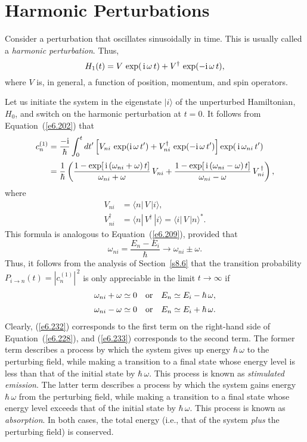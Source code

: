 \section{Harmonic Perturbations}
Consider a  perturbation that  oscillates sinusoidally in time.
This is usually called a {\em harmonic perturbation}. Thus,
\begin{equation}\label{e6.227}
H_1(t) = V\,\exp(\,{\rm i}\,\omega \,t) + V^\dagger \,\exp(-{\rm i}\,\omega\, t),
\end{equation}
where $V$ is, in general, a function of  position, momentum, and
spin operators. 

Let us initiate the system in the eigenstate $|i\rangle$ of the unperturbed
Hamiltonian, $H_0$, and switch on the harmonic perturbation at $t=0$. 
It follows from Equation~(\ref{e6.202}) that
\begin{align}\label{e6.228}
c_n^{(1)} &= \frac{-{\rm i}}{\hbar} \int_0^t dt'\left[V_{ni} \,\exp({\rm i}\,\omega
\,t') + V_{ni}^\dagger\, \exp(-{\rm i}\,\omega\, t')\right]\exp(\,{\rm i}\,
\omega_{ni}\, t')\nonumber\\[0.5ex]
&= \frac{1}{\hbar} \left(\frac{1-\exp[\,{\rm i}\,(\omega_{ni} + \omega)\,t]}
{\omega_{ni} + \omega}\, V_{ni}+\frac{1-\exp[\,{\rm i}\,(\omega_{ni}-\omega
)\,t]}
{\omega_{ni} - \omega} \,V_{ni}^{\,\dagger}\right),
\end{align}
where
\begin{align}\label{e6.229}
V_{ni} &= \langle n|\,V\,| i\rangle,\\[0.5ex]
V_{ni}^\dagger &= \langle n |\,V^\dagger\, |i\rangle = \langle i|\,V\,|n\rangle^\ast.\label{e6.230}
\end{align}
This formula is analogous to Equation~(\ref{e6.209}), provided that
\begin{equation}
\omega_{ni} = \frac{E_n-E_i}{\hbar} \rightarrow \omega_{ni}\pm \omega.
\end{equation}
Thus, it follows from  the  analysis of Section~\ref{s8.6} that
 the transition probability
$P_{i\rightarrow n}(t)=|c_n^{(1)}|^{\,2}$ is only appreciable in the limit $t\rightarrow\infty$ if
\begin{align}\label{e6.232}
\omega_{ni} + \omega \simeq  0 &~~~{\rm or}~~~  E_n \simeq E_i - \hbar\, \omega,\\[0.5ex]
\omega_{ni} - \omega \simeq 0 &~~~{\rm or}~~~  E_n \simeq E_i + \hbar\, \omega.\label{e6.233}
\end{align}
Clearly, (\ref{e6.232}) corresponds to the first term on the right-hand side
of Equation~(\ref{e6.228}), and (\ref{e6.233}) corresponds to the second term. The former
term describes a process by which the system gives up energy $\hbar\,\omega$
to the perturbing field, while making a transition 
to a final state whose energy level is less than that of the initial
state by $\hbar\,\omega$. This process is known as {\em stimulated emission}.
The latter term describes a process by which the system gains 
energy $\hbar\,\omega$ from the perturbing field, while making a transition
to a final state whose energy level exceeds that of the initial
state by $\hbar\,\omega$. This process is known as {\em absorption}. In
both cases, the total energy ({\rm i.e.}, that of the system {\em plus}\/ 
the perturbing field) is conserved.

